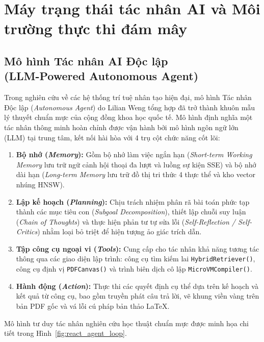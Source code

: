 \section{Máy trạng thái tác nhân AI và Môi trường thực thi đám mây}
\label{sec:react_agent}

\subsection[Mô hình Tác nhân AI Độc lập (Autonomous Agent)]{Mô hình Tác nhân AI Độc lập\\(LLM-Powered Autonomous Agent)}
\label{subsec:chu_trinh_react}
Trong nghiên cứu về các hệ thống trí tuệ nhân tạo hiện đại, mô hình Tác nhân Độc lập (\textit{Autonomous Agent}) do Lilian Weng tổng hợp \cite{weng2023agent} đã trở thành khuôn mẫu lý thuyết chuẩn mực của cộng đồng khoa học quốc tế. Mô hình định nghĩa một tác nhân thông minh hoàn chỉnh được vận hành bởi mô hình ngôn ngữ lớn (LLM) tại trung tâm, kết nối hài hòa với 4 trụ cột chức năng cốt lõi:

\begin{enumerate}[label=\textbf{(\arabic*)}]
    \item \textbf{Bộ nhớ (\textit{Memory}):} Gồm bộ nhớ làm việc ngắn hạn (\textit{Short-term Working Memory} lưu trữ ngữ cảnh hội thoại đa lượt và luồng sự kiện SSE) và bộ nhớ dài hạn (\textit{Long-term Memory} lưu trữ đồ thị tri thức 4 thực thể và kho vector nhúng HNSW).
    \item \textbf{Lập kế hoạch (\textit{Planning}):} Chịu trách nhiệm phân rã bài toán phức tạp thành các mục tiêu con (\textit{Subgoal Decomposition}), thiết lập chuỗi suy luận (\textit{Chain of Thoughts}) và thực hiện phản tư tự sửa lỗi (\textit{Self-Reflection / Self-Critics}) nhằm loại bỏ triệt để hiện tượng ảo giác trích dẫn.
    \item \textbf{Tập công cụ ngoại vi (\textit{Tools}):} Cung cấp cho tác nhân khả năng tương tác thông qua các giao diện lập trình: công cụ tìm kiếm lai \texttt{HybridRetriever()}, công cụ định vị \texttt{PDFCanvas()} và trình biên dịch cô lập \texttt{MicroVMCompiler()}.
    \item \textbf{Hành động (\textit{Action}):} Thực thi các quyết định cụ thể dựa trên kế hoạch và kết quả từ công cụ, bao gồm truyền phát câu trả lời, vẽ khung viền vàng trên bản PDF gốc và vá lỗi cú pháp bản thảo \LaTeX.
\end{enumerate}

Mô hình tư duy tác nhân nghiên cứu học thuật chuẩn mực được minh họa chi tiết trong Hình~\ref{fig:react_agent_loop}.

